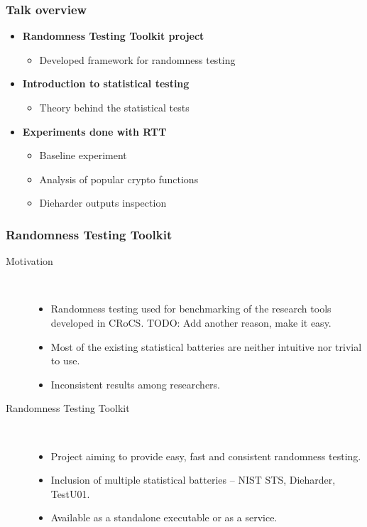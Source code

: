\documentclass[aspectratio=169]{beamer}
\begin{document}


\begin{frame}
\frametitle{Talk overview}
\begin{itemize}
\item \textbf{Randomness Testing Toolkit project}
\begin{itemize}
\item Developed framework for randomness testing
\end{itemize}
\item \textbf{Introduction to statistical testing}
\begin{itemize}
\item Theory behind the statistical tests
\end{itemize} 
\item \textbf{Experiments done with RTT}
\begin{itemize}
\item Baseline experiment
\item Analysis of popular crypto functions
\item Dieharder outputs inspection
\end{itemize}
\end{itemize}
\end{frame}

\begin{frame}
\frametitle{Randomness Testing Toolkit}

\begin{description}
\item[Motivation] \hfill \\
\begin{itemize}
\item Randomness testing used for benchmarking of the research tools developed in CRoCS. TODO: Add another reason, make it easy.
\item Most of the existing statistical batteries are neither intuitive nor trivial to use.
\item Inconsistent results among researchers.
\end{itemize}

\vspace{.5cm}

\item[Randomness Testing Toolkit] \hfill \\
\begin{itemize}
\item Project aiming to provide easy, fast and consistent randomness testing.
\item Inclusion of multiple statistical batteries -- NIST STS, Dieharder, TestU01.
\item Available as a standalone executable or as a service.
\end{itemize}
\end{description}

\end{frame}
\end{document}
